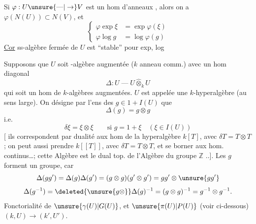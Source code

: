 Si $\varphi:U\unsure{\text{---}|\to}V$ est un hom d'anneaux ,
alors on a $\varphi(N(U))\subset N(V)$, et
\[
\left\{\begin{aligned}
\varphi\exp\xi&=\exp\varphi(\xi)\\
\varphi\log g&=\log\varphi(g)
\end{aligned}\right.
\]
\uline{Cor}  ss-algèbre fermée de $U$ est ``stable'' pour exp, log



Supposons que $U$ soit   -algèbre
augmentée ($k$ anneau comm.) avec un
hom diagonal
\[
\Delta:U\;\text{---}\;U\widehat\otimes_k U
\]
qui soit un hom de $k$-algèbres augmentées.
$U$ est appelée une $k$-hyperalgèbre  (au sens
large). On désigne par
 
 l'ens
des $g\in1+I(U)$   que
\[
\Delta(g)=g\otimes g
\]
i.e.
\[
\delta\xi=\xi\otimes\xi\qquad\text{si }g=1+\xi\quad(\xi\in I(U))
\]
[ ils correspondent par dualité aux
hom de la hyperalgèbre 
$k[T]$, avec $\delta T=T\otimes T$ ; on peut aussi
prendre $k[[T]]$, avec $\delta T=T\otimes T$, et
se borner aux hom. continus\ldots ;
cette Algèbre est le dual top. de
l'Algèbre du groupe $\mathbb Z$ ..].  Les
$g$ forment un groupe, car
\[
\Delta(gg')=\Delta(g)\Delta(g')=(g\otimes g)(g'\otimes g')
=gg'\otimes\unsure{gg'}
\]
\[
\Delta(g^{-1})=\deleted{\unsure{g\otimes}}\Delta(g)^{-1}
=(g\otimes g)^{-1}=g^{-1}\otimes g^{-1}.
\]
Fonctorialité de $\unsure{\gamma(U)|G(U)}$, et $\unsure{\pi(U)|P(U)}$
(voir ci-dessous)
 
$(k,U)\longrightarrow(k',U')$.

